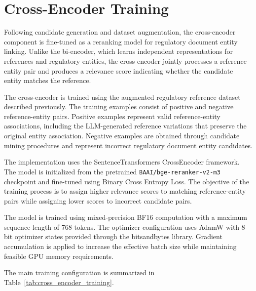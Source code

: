 \section{Cross-Encoder Training}

Following candidate generation and dataset augmentation, the cross-encoder component is fine-tuned as a reranking model for regulatory document entity linking. Unlike the bi-encoder, which learns independent representations for references and regulatory entities, the cross-encoder jointly processes a reference-entity pair and produces a relevance score indicating whether the candidate entity matches the reference.

The cross-encoder is trained using the augmented regulatory reference dataset described previously. The training examples consist of positive and negative reference-entity pairs. Positive examples represent valid reference-entity associations, including the LLM-generated reference variations that preserve the original entity association. Negative examples are obtained through candidate mining procedures and represent incorrect regulatory document entity candidates.

The implementation uses the SentenceTransformers CrossEncoder framework. The model is initialized from the pretrained \texttt{BAAI/bge-reranker-v2-m3} checkpoint and fine-tuned using Binary Cross Entropy Loss. The objective of the training process is to assign higher relevance scores to matching reference-entity pairs while assigning lower scores to incorrect candidate pairs.

The model is trained using mixed-precision BF16 computation with a maximum sequence length of 768 tokens. The optimizer configuration uses AdamW with 8-bit optimizer states provided through the bitsandbytes library. Gradient accumulation is applied to increase the effective batch size while maintaining feasible GPU memory requirements.

The main training configuration is summarized in Table~\ref{tab:cross_encoder_training}.


